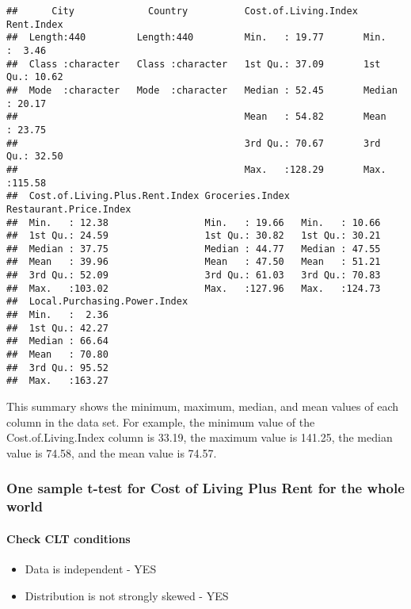\documentclass[
]{article}
\providecommand{\tightlist}{%
  \setlength{\itemsep}{0pt}\setlength{\parskip}{0pt}}
\begin{document}
\begin{verbatim}
##      City             Country          Cost.of.Living.Index   Rent.Index    
##  Length:440         Length:440         Min.   : 19.77       Min.   :  3.46  
##  Class :character   Class :character   1st Qu.: 37.09       1st Qu.: 10.62  
##  Mode  :character   Mode  :character   Median : 52.45       Median : 20.17  
##                                        Mean   : 54.82       Mean   : 23.75  
##                                        3rd Qu.: 70.67       3rd Qu.: 32.50  
##                                        Max.   :128.29       Max.   :115.58  
##  Cost.of.Living.Plus.Rent.Index Groceries.Index  Restaurant.Price.Index
##  Min.   : 12.38                 Min.   : 19.66   Min.   : 10.66        
##  1st Qu.: 24.59                 1st Qu.: 30.82   1st Qu.: 30.21        
##  Median : 37.75                 Median : 44.77   Median : 47.55        
##  Mean   : 39.96                 Mean   : 47.50   Mean   : 51.21        
##  3rd Qu.: 52.09                 3rd Qu.: 61.03   3rd Qu.: 70.83        
##  Max.   :103.02                 Max.   :127.96   Max.   :124.73        
##  Local.Purchasing.Power.Index
##  Min.   :  2.36              
##  1st Qu.: 42.27              
##  Median : 66.64              
##  Mean   : 70.80              
##  3rd Qu.: 95.52              
##  Max.   :163.27
\end{verbatim}

This summary shows the minimum, maximum, median, and mean values of each
column in the data set. For example, the minimum value of the
Cost.of.Living.Index column is 33.19, the maximum value is 141.25, the
median value is 74.58, and the mean value is 74.57.

\subsubsection{One sample t-test for Cost of Living Plus Rent for the
whole
world}\label{one-sample-t-test-for-cost-of-living-plus-rent-for-the-whole-world}

\paragraph{Check CLT conditions}\label{check-clt-conditions}

\begin{itemize}
\tightlist
\item
  Data is independent - YES
\item
  Distribution is not strongly skewed - YES
\end{itemize}
\end{document}
